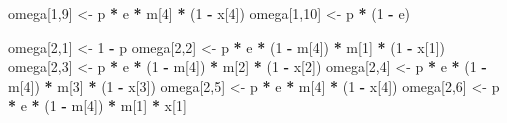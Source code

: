 \documentclass[
  12pt,
]{krantz}
\newenvironment{Shaded}{\begin{snugshade}}{\end{snugshade}}
\newcommand{\DecValTok}[1]{\textcolor[rgb]{0.00,0.00,0.81}{#1}}
\newcommand{\NormalTok}[1]{#1}
\newcommand{\OtherTok}[1]{\textcolor[rgb]{0.56,0.35,0.01}{#1}}
\newcommand{\SpecialCharTok}[1]{\textcolor[rgb]{0.81,0.36,0.00}{\textbf{#1}}}
\begin{document}
\begin{Shaded}
\begin{Highlighting}[]
\NormalTok{omega[}\DecValTok{1}\NormalTok{,}\DecValTok{9}\NormalTok{] }\OtherTok{\textless{}{-}}\NormalTok{ p }\SpecialCharTok{*}\NormalTok{ e }\SpecialCharTok{*}\NormalTok{ m[}\DecValTok{4}\NormalTok{] }\SpecialCharTok{*}\NormalTok{ (}\DecValTok{1} \SpecialCharTok{{-}}\NormalTok{ x[}\DecValTok{4}\NormalTok{])      }
\NormalTok{omega[}\DecValTok{1}\NormalTok{,}\DecValTok{10}\NormalTok{] }\OtherTok{\textless{}{-}}\NormalTok{ p }\SpecialCharTok{*}\NormalTok{ (}\DecValTok{1} \SpecialCharTok{{-}}\NormalTok{ e)      }

\NormalTok{omega[}\DecValTok{2}\NormalTok{,}\DecValTok{1}\NormalTok{] }\OtherTok{\textless{}{-}} \DecValTok{1} \SpecialCharTok{{-}}\NormalTok{ p                                  }
\NormalTok{omega[}\DecValTok{2}\NormalTok{,}\DecValTok{2}\NormalTok{] }\OtherTok{\textless{}{-}}\NormalTok{ p }\SpecialCharTok{*}\NormalTok{ e }\SpecialCharTok{*}\NormalTok{ (}\DecValTok{1} \SpecialCharTok{{-}}\NormalTok{ m[}\DecValTok{4}\NormalTok{]) }\SpecialCharTok{*}\NormalTok{ m[}\DecValTok{1}\NormalTok{] }\SpecialCharTok{*}\NormalTok{ (}\DecValTok{1} \SpecialCharTok{{-}}\NormalTok{ x[}\DecValTok{1}\NormalTok{])      }
\NormalTok{omega[}\DecValTok{2}\NormalTok{,}\DecValTok{3}\NormalTok{] }\OtherTok{\textless{}{-}}\NormalTok{ p }\SpecialCharTok{*}\NormalTok{ e }\SpecialCharTok{*}\NormalTok{ (}\DecValTok{1} \SpecialCharTok{{-}}\NormalTok{ m[}\DecValTok{4}\NormalTok{]) }\SpecialCharTok{*}\NormalTok{ m[}\DecValTok{2}\NormalTok{] }\SpecialCharTok{*}\NormalTok{ (}\DecValTok{1} \SpecialCharTok{{-}}\NormalTok{ x[}\DecValTok{2}\NormalTok{])      }
\NormalTok{omega[}\DecValTok{2}\NormalTok{,}\DecValTok{4}\NormalTok{] }\OtherTok{\textless{}{-}}\NormalTok{ p }\SpecialCharTok{*}\NormalTok{ e }\SpecialCharTok{*}\NormalTok{ (}\DecValTok{1} \SpecialCharTok{{-}}\NormalTok{ m[}\DecValTok{4}\NormalTok{]) }\SpecialCharTok{*}\NormalTok{ m[}\DecValTok{3}\NormalTok{] }\SpecialCharTok{*}\NormalTok{ (}\DecValTok{1} \SpecialCharTok{{-}}\NormalTok{ x[}\DecValTok{3}\NormalTok{])      }
\NormalTok{omega[}\DecValTok{2}\NormalTok{,}\DecValTok{5}\NormalTok{] }\OtherTok{\textless{}{-}}\NormalTok{ p }\SpecialCharTok{*}\NormalTok{ e }\SpecialCharTok{*}\NormalTok{ m[}\DecValTok{4}\NormalTok{] }\SpecialCharTok{*}\NormalTok{ (}\DecValTok{1} \SpecialCharTok{{-}}\NormalTok{ x[}\DecValTok{4}\NormalTok{])      }
\NormalTok{omega[}\DecValTok{2}\NormalTok{,}\DecValTok{6}\NormalTok{] }\OtherTok{\textless{}{-}}\NormalTok{ p }\SpecialCharTok{*}\NormalTok{ e }\SpecialCharTok{*}\NormalTok{ (}\DecValTok{1} \SpecialCharTok{{-}}\NormalTok{ m[}\DecValTok{4}\NormalTok{]) }\SpecialCharTok{*}\NormalTok{ m[}\DecValTok{1}\NormalTok{] }\SpecialCharTok{*}\NormalTok{ x[}\DecValTok{1}\NormalTok{]      }

\end{Highlighting}
\end{Shaded}
\end{document}
